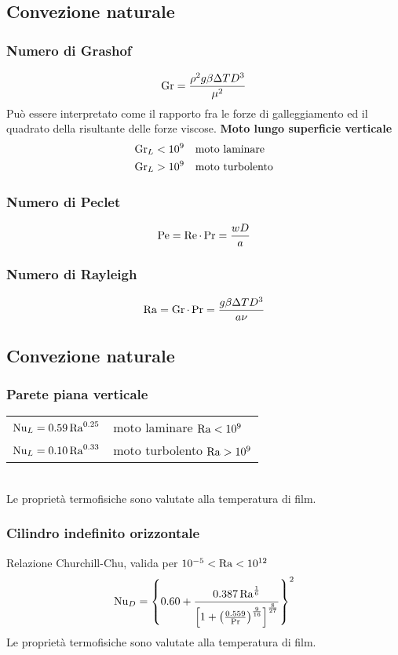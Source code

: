 \subsection{Convezione naturale}
\subsubsection{Numero di Grashof}
\[  \operatorname{Gr} = \frac{\rho^2 g \beta \Delta T D^3}{\mu^2} \]
Può essere interpretato come il rapporto fra le forze di galleggiamento ed il quadrato della risultante delle forze viscose.
\textbf{Moto lungo superficie verticale}\\
\begin{align*}
    \operatorname{Gr}_{L} < 10^9 & \quad \text{moto laminare} \\
    \operatorname{Gr}_{L} > 10^9 & \quad \text{moto turbolento} \\
\end{align*} 

\subsubsection{Numero di Peclet}
\[ \operatorname{Pe} = \operatorname{Re} \cdot \operatorname{Pr} = \frac{w D}{a} \]

\subsubsection{Numero di Rayleigh}
\[ \operatorname{Ra} = \operatorname{Gr} \cdot \operatorname{Pr} = \frac{g \beta \Delta T D^3}{a \nu} \]

\subsection{Convezione naturale}
\subsubsection{Parete piana verticale}
\begin{tabular}{ll}
    $\operatorname{Nu}_{L} = 0.59 \operatorname{Ra}^{0.25}$ & moto laminare $\operatorname{Ra} < 10^9$\\
    $\operatorname{Nu}_{L} = 0.10 \operatorname{Ra}^{0.33}$ & moto turbolento $\operatorname{Ra} > 10^9$\\
\end{tabular}\\
Le proprietà termofisiche sono valutate alla temperatura di film.

\subsubsection{Cilindro indefinito orizzontale}
Relazione Churchill-Chu, valida per $10^{-5} < \operatorname{Ra} < 10^{12}$
\[ \operatorname{Nu}_{D} =
\qty{0.60 + \frac{0.387 \operatorname{Ra}^{\frac{1}{6}}}
    {\qty[1 + \qty(\frac{0.559}{\operatorname{Pr}})^{\frac{9}{16}}]^{\frac{8}{27}}}
}^2 \]
Le proprietà termofisiche sono valutate alla temperatura di film.
